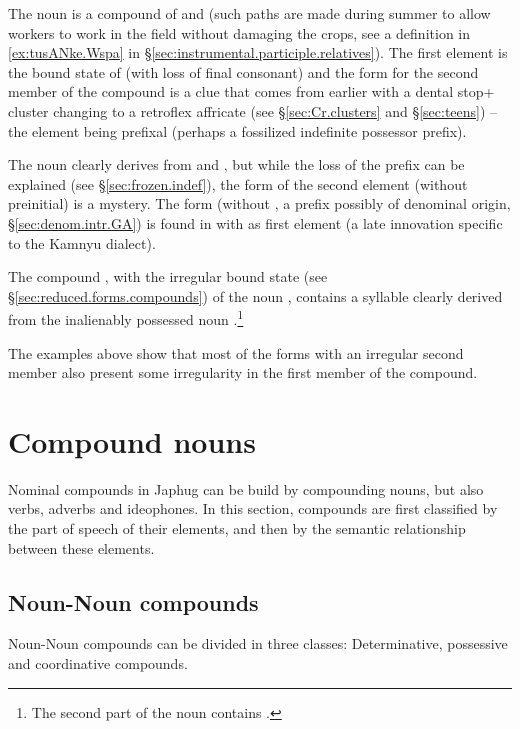 The noun  is a compound of  and  (such paths are made during summer to allow workers to work in the field without damaging the crops, see a definition in \ref{ex:tusANke.Wspa} in §\ref{sec:instrumental.participle.relatives}). The first element  is the bound state of  (with loss of final consonant) and the form  for the second member of the compound is a clue that  comes from earlier  with a dental stop+ cluster changing to a retroflex affricate (see §\ref{sec:Cr.clusters} and §\ref{sec:teens}) -- the  element being prefixal (perhaps a fossilized indefinite possessor prefix).

The noun  clearly derives from  and , but while the loss of the  prefix can be explained (see §\ref{sec:frozen.indef}), the form of the second element (without  preinitial) is a mystery. The form  (without , a prefix possibly of denominal origin, §\ref{sec:denom.intr.GA}) is found in  with  as first element (a late innovation specific to the Kamnyu dialect).
 
 The compound , with the irregular bound state  (see §\ref{sec:reduced.forms.compounds}) of the noun , contains a syllable  clearly derived from the inalienably possessed noun .\footnote{The second part of the noun  contains . } 
 
The examples above show that most of the forms with an irregular second member also present some irregularity in the first member of the compound. 

\section{Compound nouns}
Nominal compounds in Japhug can be build by compounding nouns, but also verbs, adverbs and ideophones. In this section, compounds are first classified by the part of speech of their elements, and then by the semantic relationship between these elements.

\subsection{Noun-Noun compounds} \label{sec.n.n.compounds}
Noun-Noun compounds can be divided in three classes: Determinative, possessive and coordinative compounds.

